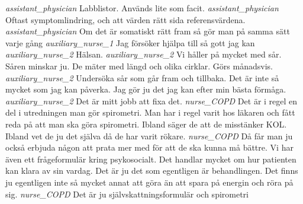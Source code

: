 \documentclass[12pt,a4paper,oneside]{article}
\begin{document}
 {\it assistant\_physician %
} 
Labblistor. Används lite som facit. %
 {\it assistant\_physician %
} 
Oftast symptomlindring, och att värden rätt sida referensvärdena.  %
 {\it assistant\_physician %
} 
Om det är somatiskt rätt fram så gör man på samma sätt varje gång %
 {\it auxiliary\_nurse\_1 %
} 
Jag försöker hjälpa till så gott jag kan %
 {\it auxiliary\_nurse\_2 %
} 
Hälsan.  %
 {\it auxiliary\_nurse\_2 %
} 
Vi håller på mycket med sår. Såren minskar ju. De mäter med längd och olika cirklar. Görs månadsvis. %
 {\it auxiliary\_nurse\_2 %
} 
Undersöka sår som går fram och tillbaka. Det är inte så mycket som jag kan påverka. Jag gör ju det jag kan efter min bästa förmåga. %
 {\it auxiliary\_nurse\_2 %
} 
Det är mitt jobb att fixa det. %
 {\it nurse\_COPD %
} 
Det är i regel en del i utredningen man gör spirometri. Man har i regel varit hos läkaren och fått reda på att man ska göra spirometri. Ibland säger de att de misstänker KOL. Ibland vet de ju det själva då de har varit rökare. %
 {\it nurse\_COPD %
} 
Då får man ju också erbjuda någon att prata mer med för att de ska kunna må bättre. Vi har även ett frågeformulär kring psykosocialt. Det handlar mycket om hur patienten kan klara av sin vardag. Det är ju det som egentligen är behandlingen. Det finns ju egentligen inte så mycket annat att göra än att spara på energin och röra på sig. %
 {\it nurse\_COPD %
} 
Det är ju självskattningsformulär och spirometri %
\end{document}
